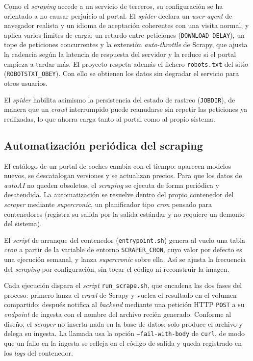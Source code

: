 Como el \emph{scraping} accede a un servicio de terceros, su configuración se ha
orientado a no causar perjuicio al portal. El \emph{spider} declara un
\emph{user-agent} de navegador realista y un idioma de aceptación coherentes con
una visita normal, y aplica varios límites de carga: un retardo entre peticiones
(\texttt{DOWNLOAD\_DELAY}), un tope de peticiones concurrentes y la extensión
\emph{auto-throttle} de Scrapy, que ajusta la cadencia según la latencia de
respuesta del servidor y la reduce si el portal empieza a tardar más. El proyecto
respeta además el fichero \texttt{robots.txt} del sitio (\texttt{ROBOTSTXT\_OBEY}).
Con ello se obtienen los datos sin degradar el servicio para otros usuarios.

El \emph{spider} habilita asimismo la persistencia del estado de rastreo
(\texttt{JOBDIR}), de manera que un \emph{crawl} interrumpido puede reanudarse
sin repetir las peticiones ya realizadas, lo que ahorra carga tanto al portal
como al propio sistema.

\subsection{Automatización periódica del scraping}
\label{sec:impl-scraping-cron}

El catálogo de un portal de coches cambia con el tiempo: aparecen modelos nuevos,
se descatalogan versiones y se actualizan precios. Para que los datos de
\emph{autoAI} no queden obsoletos, el \emph{scraping} se ejecuta de forma
periódica y desatendida. La automatización se resuelve dentro del propio
contenedor del \emph{scraper} mediante \emph{supercronic}, un planificador tipo
\emph{cron} pensado para contenedores (registra su salida por la salida estándar
y no requiere un demonio del sistema).

El \emph{script} de arranque del contenedor (\texttt{entrypoint.sh}) genera al
vuelo una tabla \emph{cron} a partir de la variable de entorno
\texttt{SCRAPER\_CRON}, cuyo valor por defecto es una ejecución semanal, y lanza
\emph{supercronic} sobre ella. Así se ajusta la frecuencia del \emph{scraping} por
configuración, sin tocar el código ni reconstruir la imagen.

Cada ejecución dispara el \emph{script} \texttt{run\_scrape.sh}, que encadena las
dos fases del proceso: primero lanza el \emph{crawl} de Scrapy y vuelca el
resultado en el volumen compartido; después notifica al \emph{backend} mediante
una petición HTTP \texttt{POST} a su \emph{endpoint} de ingesta con el nombre del
archivo recién generado. Conforme al diseño, el \emph{scraper} no inserta nada en
la base de datos: solo produce el archivo y delega su ingesta. La llamada usa la
opción \texttt{--fail-with-body} de \texttt{curl}, de modo que un fallo en la
ingesta se refleja en el código de salida y queda registrado en los \emph{logs}
del contenedor.

